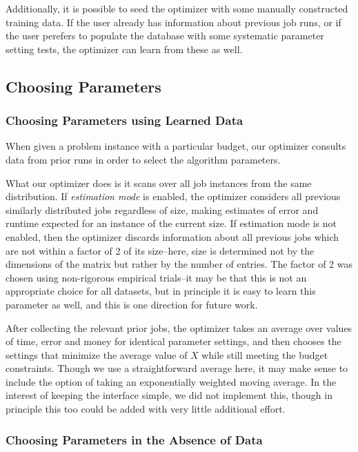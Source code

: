 Additionally, it is possible to seed the optimizer with some manually
constructed training data. If the user already has information about 
previous job runs, or if the user perefers to populate the database
with some systematic parameter setting tests, the optimizer can learn
from these as well. 


\subsection{Choosing Parameters}

\subsubsection{Choosing Parameters using Learned Data}
When given a problem instance with a particular budget, our optimizer
consults data from prior runs in order to select the algorithm 
parameters.

What our optimizer does is it scans over all job instances
from the same distribution. If {\em estimation mode} is enabled, 
the optimizer
considers all previous similarly distributed jobs regardless of size, 
making estimates of error and runtime expected for an instance 
of the current size. If estimation mode is not enabled, then the optimizer
discards information about all previous jobs which are not within a
factor of 2 of its size--here, size is determined not by the dimensions
of the matrix but rather by the number of entries. The factor of 2 was 
chosen using non-rigorous empirical trials--it may be that this is not
an appropriate choice for all datasets, but in principle it is easy to
learn this parameter as well, and this is one direction for future work.  

After collecting the relevant prior jobs, 
the optimizer takes an average over values of
time, error and money for identical parameter settings, 
and then chooses the settings that minimize the average value of $X$ while
still meeting the budget constraints. Though we use a straightforward
average here, it may make sense to include the option of taking an
exponentially weighted moving average. In the interest of keeping the
interface simple, we did not implement this, though in principle this too 
could be added with very little additional effort. 

\subsubsection{Choosing Parameters in the Absence of Data}
\label{sec:nodata}

